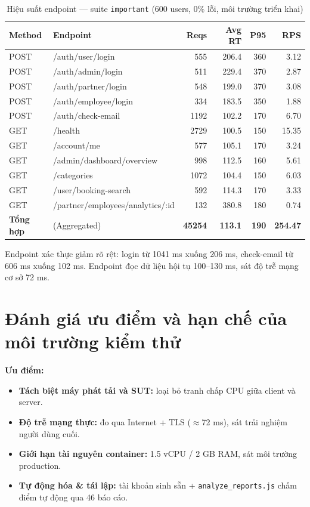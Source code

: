 \begin{table}[H]
\centering
\footnotesize
\begin{tabularx}{\textwidth}{|l|X|r|r|r|r|}
\hline
\textbf{Method} & \textbf{Endpoint} & \textbf{Reqs} & \textbf{Avg RT} & \textbf{P95} & \textbf{RPS} \\
\hline
POST & /auth/user/login & 555 & 206.4 & 360 & 3.12 \\
\hline
POST & /auth/admin/login & 511 & 229.4 & 370 & 2.87 \\
\hline
POST & /auth/partner/login & 548 & 199.0 & 370 & 3.08 \\
\hline
POST & /auth/employee/login & 334 & 183.5 & 350 & 1.88 \\
\hline
POST & /auth/check-email & 1192 & 102.2 & 170 & 6.70 \\
\hline
GET & /health & 2729 & 100.5 & 150 & 15.35 \\
\hline
GET & /account/me & 577 & 105.1 & 170 & 3.24 \\
\hline
GET & /admin/dashboard/overview & 998 & 112.5 & 160 & 5.61 \\
\hline
GET & /categories & 1072 & 104.4 & 150 & 6.03 \\
\hline
GET & /user/booking-search & 592 & 114.3 & 170 & 3.33 \\
\hline
GET & /partner/employees/analytics/:id & 132 & 380.8 & 180 & 0.74 \\
\hline
\textbf{Tổng hợp} & (Aggregated) & \textbf{45254} & \textbf{113.1} & \textbf{190} & \textbf{254.47} \\
\hline
\end{tabularx}
\caption{Hiệu suất endpoint --- suite \texttt{important} (600 users, 0\% lỗi, môi trường triển khai)}
\label{tab:perf_important_endpoints}
\end{table}

Endpoint xác thực giảm rõ rệt: login từ 1041 ms xuống 206 ms, check-email từ 606 ms xuống 102 ms. Endpoint đọc dữ liệu hội tụ 100--130 ms, sát độ trễ mạng cơ sở 72 ms.


\section{Đánh giá ưu điểm và hạn chế của môi trường kiểm thử}

\noindent\textbf{Ưu điểm:}
\begin{itemize}
    \item \textbf{Tách biệt máy phát tải và SUT:} loại bỏ tranh chấp CPU giữa client và server.
    \item \textbf{Độ trễ mạng thực:} đo qua Internet + TLS ($\approx$72 ms), sát trải nghiệm người dùng cuối.
    \item \textbf{Giới hạn tài nguyên container:} 1.5 vCPU / 2 GB RAM, sát môi trường production.
    \item \textbf{Tự động hóa \& tái lập:} tài khoản sinh sẵn + \texttt{analyze\_reports.js} chấm điểm tự động qua 46 báo cáo.
\end{itemize}

